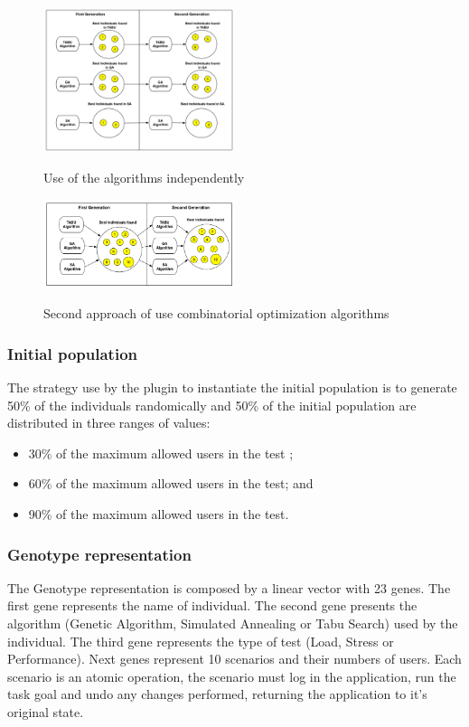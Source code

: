 \begin{figure}[h]
\caption{Use of the algorithms independently}
\includegraphics[width=0.5\textwidth]{./images/independ.png}
\label{fig:firstaproach}
\end{figure}
\begin{figure}
\caption{Second approach of use combinatorial optimization algorithms}
\includegraphics[width=0.5\textwidth]{./images/collaborative.png}
\label{fig:secondapproach}
\end{figure}

\subsubsection{Initial population}

The strategy use by the plugin to instantiate the initial population is to generate 50\% of the individuals randomically and 50\% of the initial population are distributed in three  ranges of values:

\begin{itemize}
\item 30\% of the maximum allowed users in the test ;
\item 60\% of the maximum allowed users in the test; and
\item 90\% of the maximum allowed users in the test.
\end{itemize}


\subsubsection{Genotype representation}

The Genotype representation is composed by a linear vector with 23 genes. The first gene represents the name of individual. The second gene presents the  algorithm (Genetic Algorithm, Simulated Annealing or Tabu Search) used by the individual. The third gene represents the type of test (Load, Stress or Performance). Next genes represent 10 scenarios and their numbers of users. Each scenario is an atomic operation, the scenario must log in the application, run the task goal and undo any changes performed, returning the application to it's original state. 

